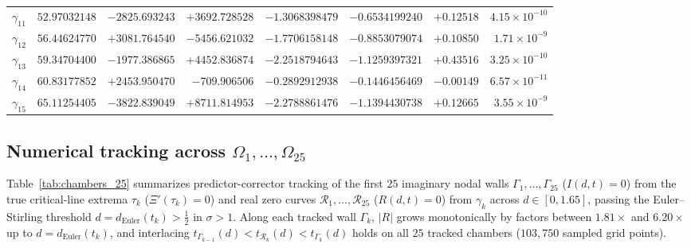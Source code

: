 \documentclass[11pt,a4paper,reqno]{amsart}
\theoremstyle{definition}
\theoremstyle{remark}
\numberwithin{equation}{section}
\begin{document}
\begin{table}[htbp]
\begin{tabular}{crrrrrrr}
$\gamma_{11}$ & $52.97032148$ & $-2825.693243$ & $+3692.728528$ & $-1.3068398479$ & $-0.6534199240$ & $+0.12518$ & $4.15 \times 10^{-10}$ \\
$\gamma_{12}$ & $56.44624770$ & $+3081.764540$ & $-5456.621032$ & $-1.7706158148$ & $-0.8853079074$ & $+0.10850$ & $1.71 \times 10^{-9}$  \\
$\gamma_{13}$ & $59.34704400$ & $-1977.386865$ & $+4452.836874$ & $-2.2518794643$ & $-1.1259397321$ & $+0.43516$ & $3.25 \times 10^{-10}$ \\
$\gamma_{14}$ & $60.83177852$ & $+2453.950470$ & $-709.906506$  & $-0.2892912938$ & $-0.1446456469$ & $-0.00149$ & $6.57 \times 10^{-11}$ \\
$\gamma_{15}$ & $65.11254405$ & $-3822.839049$ & $+8711.814953$ & $-2.2788861476$ & $-1.1394430738$ & $+0.12665$ & $3.55 \times 10^{-9}$  \\
\bottomrule
\end{tabular}
\end{table}

\subsection{Numerical tracking across \texorpdfstring{$\Omega_1, \dots, \Omega_{25}$}{Omega\_1..Omega\_25}}\label{subsec:num_chambers}

Table~\ref{tab:chambers_25} summarizes predictor-corrector tracking of the first $25$ imaginary nodal walls $\Gamma_1,\dots,\Gamma_{25}$ ($I(d,t) = 0$) from the true critical-line extrema $\tau_k$ ($\Xi'(\tau_k) = 0$) and real zero curves $\mathcal{R}_1,\dots,\mathcal{R}_{25}$ ($R(d,t) = 0$) from $\gamma_k$ across $d \in [0, 1.65]$, passing the Euler--Stirling threshold $d = d_{\mathrm{Euler}}(t_k) > \frac{1}{2}$ in $\sigma > 1$. Along each tracked wall $\Gamma_k$, $|R|$ grows monotonically by factors between $1.81\times$ and $6.20\times$ up to $d = d_{\mathrm{Euler}}(t_k)$, and interlacing $t_{\Gamma_{k-1}}(d) < t_{\mathcal{R}_k}(d) < t_{\Gamma_k}(d)$ holds on all $25$ tracked chambers ($103{,}750$ sampled grid points).
\end{document}
